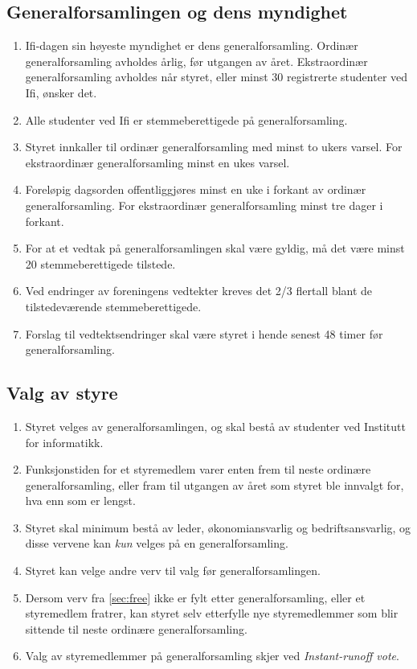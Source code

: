 \documentclass[norsk,a4paper]{article}
\begin{document}
\subsection{Generalforsamlingen og dens myndighet}
\begin{enumerate}
	\item{Ifi-dagen sin høyeste myndighet er dens generalforsamling. Ordinær generalforsamling avholdes årlig, før utgangen av året. Ekstraordinær generalforsamling avholdes når styret, eller minst 30 registrerte studenter ved Ifi, ønsker det.}
	\item{Alle studenter ved Ifi er stemmeberettigede på generalforsamling.}
	\item{Styret innkaller til ordinær generalforsamling med minst to ukers varsel. For ekstraordinær generalforsamling minst en ukes varsel.}
	\item{Foreløpig dagsorden offentliggjøres minst en uke i forkant av ordinær generalforsamling. For ekstraordinær generalforsamling minst tre dager i forkant.}
	\item{For at et vedtak på generalforsamlingen skal være gyldig, må det være minst 20 stemmeberettigede tilstede.}
	\item{Ved endringer av foreningens vedtekter kreves det 2/3 flertall blant de tilstedeværende stemmeberettigede.}
	\item{Forslag til vedtektsendringer skal være styret i hende senest 48 timer før generalforsamling.}
\end{enumerate}

\subsection{Valg av styre}
\begin{enumerate}
	\item Styret velges av generalforsamlingen, og skal bestå av studenter ved Institutt for informatikk.
	\item Funksjonstiden for et styremedlem varer enten frem til neste ordinære generalforsamling, eller fram til utgangen av året som styret ble innvalgt for, hva enn som er lengst.
	\item Styret skal minimum bestå av leder, økonomiansvarlig og bedriftsansvarlig, og disse vervene kan \textit{kun} velges på en generalforsamling\label{sec:protected}.
	\item Styret kan velge andre verv til valg før generalforsamlingen\label{sec:free}.
	\item Dersom verv fra \cref{sec:free} ikke er fylt etter generalforsamling, eller et styremedlem fratrer, kan styret selv etterfylle nye styremedlemmer som blir sittende til neste ordinære generalforsamling.
	\item Valg av styremedlemmer på generalforsamling skjer ved \textit{Instant-runoff vote}\footnotemark.
\end{enumerate}
\end{document}
